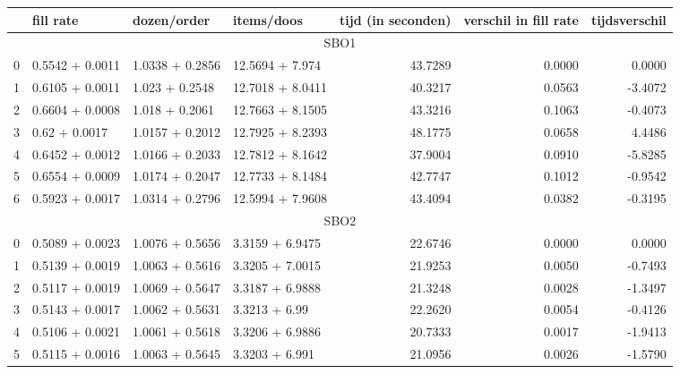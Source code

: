 \begin{tabular}{llllrrr}
  \toprule
  {} &        fill rate &      dozen/order &       items/doos &  tijd (in seconden) &  verschil in fill rate &  tijdsverschil \\
  \midrule
  \multicolumn{7}{c}{SBO1} \\
  \midrule
  0 &  0.5542 + 0.0011 &  1.0338 + 0.2856 &   12.5694 + 7.974 &             43.7289 &                 0.0000 &         0.0000 \\
  1 &  0.6105 + 0.0011 &   1.023 + 0.2548 &  12.7018 + 8.0411 &             40.3217 &                 0.0563 &        -3.4072 \\
  2 &  0.6604 + 0.0008 &   1.018 + 0.2061 &  12.7663 + 8.1505 &             43.3216 &                 0.1063 &        -0.4073 \\
  3 &    0.62 + 0.0017 &  1.0157 + 0.2012 &  12.7925 + 8.2393 &             48.1775 &                 0.0658 &         4.4486 \\
  4 &  0.6452 + 0.0012 &  1.0166 + 0.2033 &  12.7812 + 8.1642 &             37.9004 &                 0.0910 &        -5.8285 \\
  5 &  0.6554 + 0.0009 &  1.0174 + 0.2047 &  12.7733 + 8.1484 &             42.7747 &                 0.1012 &        -0.9542 \\
  6 &  0.5923 + 0.0017 &  1.0314 + 0.2796 &  12.5994 + 7.9608 &             43.4094 &                 0.0382 &        -0.3195 \\
  \midrule
  \multicolumn{7}{c}{SBO2} \\
  \midrule
  0 &  0.5089 + 0.0023 &  1.0076 + 0.5656 &  3.3159 + 6.9475 &             22.6746 &                 0.0000 &         0.0000 \\
  1 &  0.5139 + 0.0019 &  1.0063 + 0.5616 &  3.3205 + 7.0015 &             21.9253 &                 0.0050 &        -0.7493 \\
  2 &  0.5117 + 0.0019 &  1.0069 + 0.5647 &  3.3187 + 6.9888 &             21.3248 &                 0.0028 &        -1.3497 \\
  3 &  0.5143 + 0.0017 &  1.0062 + 0.5631 &    3.3213 + 6.99 &             22.2620 &                 0.0054 &        -0.4126 \\
  4 &  0.5106 + 0.0021 &  1.0061 + 0.5618 &  3.3206 + 6.9886 &             20.7333 &                 0.0017 &        -1.9413 \\
  5 &  0.5115 + 0.0016 &  1.0063 + 0.5645 &   3.3203 + 6.991 &             21.0956 &                 0.0026 &        -1.5790 \\

\end{tabular}
